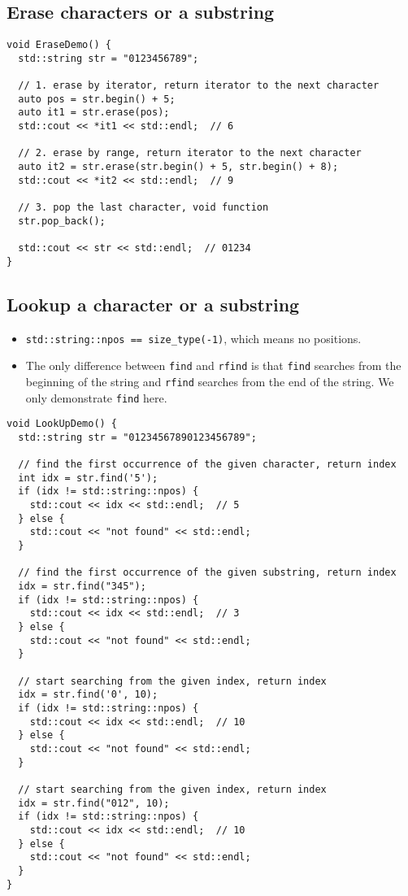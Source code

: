 \subsection{Erase characters or a substring}
\begin{lstlisting}
void EraseDemo() {
  std::string str = "0123456789";

  // 1. erase by iterator, return iterator to the next character
  auto pos = str.begin() + 5;
  auto it1 = str.erase(pos);
  std::cout << *it1 << std::endl;  // 6

  // 2. erase by range, return iterator to the next character
  auto it2 = str.erase(str.begin() + 5, str.begin() + 8);
  std::cout << *it2 << std::endl;  // 9

  // 3. pop the last character, void function
  str.pop_back();

  std::cout << str << std::endl;  // 01234
}
\end{lstlisting}

\subsection{Lookup a character or a substring}
\begin{itemize}
\item {\colorbox{CodeBackground}{\lstinline|std::string::npos == size_type(-1)|}}, which means no positions.
\item The only difference between {\colorbox{CodeBackground}{\lstinline|find|}} and {\colorbox{CodeBackground}{\lstinline|rfind|}} is that {\colorbox{CodeBackground}{\lstinline|find|}} searches from the beginning of the string and {\colorbox{CodeBackground}{\lstinline|rfind|}} searches from the end of the string. We only demonstrate {\colorbox{CodeBackground}{\lstinline|find|}} here.
\end{itemize}

\begin{lstlisting}
void LookUpDemo() {
  std::string str = "01234567890123456789";

  // find the first occurrence of the given character, return index
  int idx = str.find('5');
  if (idx != std::string::npos) {
    std::cout << idx << std::endl;  // 5
  } else {
    std::cout << "not found" << std::endl;
  }

  // find the first occurrence of the given substring, return index
  idx = str.find("345");
  if (idx != std::string::npos) {
    std::cout << idx << std::endl;  // 3
  } else {
    std::cout << "not found" << std::endl;
  }

  // start searching from the given index, return index
  idx = str.find('0', 10);
  if (idx != std::string::npos) {
    std::cout << idx << std::endl;  // 10
  } else {
    std::cout << "not found" << std::endl;
  }

  // start searching from the given index, return index
  idx = str.find("012", 10);
  if (idx != std::string::npos) {
    std::cout << idx << std::endl;  // 10
  } else {
    std::cout << "not found" << std::endl;
  }
}
\end{lstlisting}

